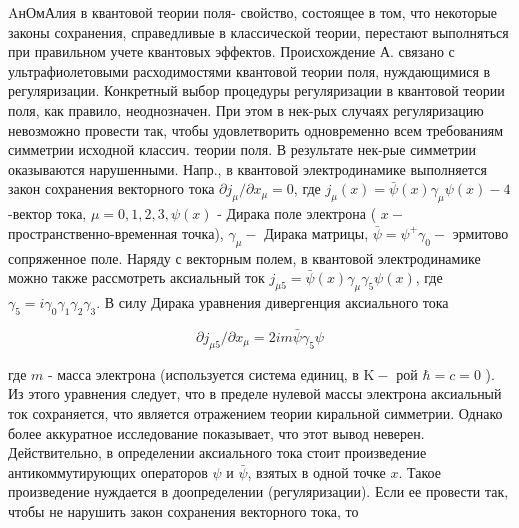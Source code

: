 \documentclass[10pt]{article}
\begin{document}
AнОмАлия в квантовой теории поля- свойство, состоящее в том, что некоторые законы сохранения, справедливые в классической теории, перестают выполняться при правильном учете квантовых эффектов. Происхождение А. связано с ультрафиолетовыми расходимостями квантовой теории поля, нуждающимися в регуляризации. Конкретный выбор процедуры регуляризации в квантовой теории поля, как правило, неоднозначен. При этом в нек-рых случаях регуляризацию невозможно провести так, чтобы удовлетворить одновременно всем требованиям симметрии исходной классич. теории поля. В результате нек-рые симметрии оказываются нарушенными. Напр., в квантовой электродинамике выполняется закон сохранения векторного тока $\partial j_{\mu} / \partial x_{\mu}=0$, где $j_{\mu}(x)=\bar{\psi}(x) \gamma_{\mu} \psi(x)-4$-вектор тока, $\mu=0,1,2,3, \psi(x)$ - Дирака поле электрона ( $x-$ пространственно-временная точка), $\gamma_{\mu}-$ Дирака матрицы, $\bar{\psi}=\psi^{+} \gamma_{0}-$ эрмитово сопряженное поле. Наряду с векторным полем, в квантовой электродинамике можно также рассмотреть аксиальный ток $j_{\mu 5}=\bar{\psi}(x) \gamma_{\mu} \gamma_{5} \psi(x)$, где $\gamma_{5}=i \gamma_{0} \gamma_{1} \gamma_{2} \gamma_{3}$. В силу Дирака уравнения дивергенция аксиального тока



\[

\partial j_{\mu 5} / \partial x_{\mu}=2 i m \bar{\psi} \gamma_{5} \psi

\]



где $m$ - масса электрона (используется система единиц, в $\mathrm{K}-$ рой $\hbar=c=0$ ). Из этого уравнения следует, что в пределе нулевой массы электрона аксиальный ток сохраняется, что является отражением теории киральной симметрии. Однако более аккуратное исследование показывает, что этот вывод неверен. Действительно, в определении аксиального тока стоит произведение антикоммутирующих операторов $\psi$ и $\bar{\psi}$, взятых в одной точке $x$. Такое произведение нуждается в доопределении (регуляризации). Если ее провести так, чтобы не нарушить закон сохранения векторного тока, то
\end{document}
